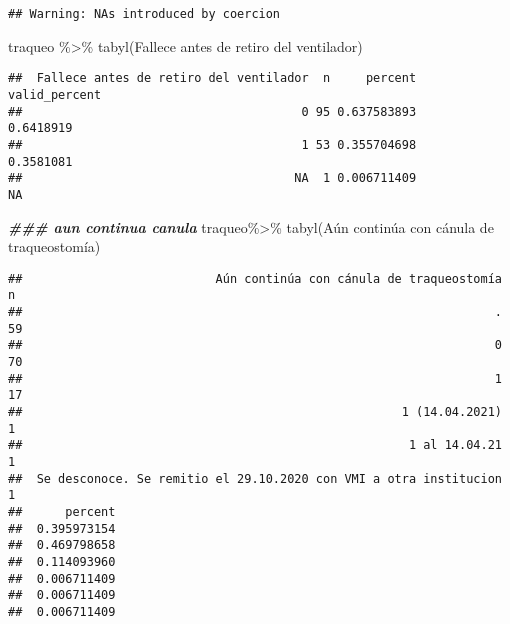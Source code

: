 \documentclass[
]{article}
\newenvironment{Shaded}{\begin{snugshade}}{\end{snugshade}}
\newcommand{\AttributeTok}[1]{\textcolor[rgb]{0.77,0.63,0.00}{#1}}
\newcommand{\DocumentationTok}[1]{\textcolor[rgb]{0.56,0.35,0.01}{\textbf{\textit{#1}}}}
\newcommand{\FunctionTok}[1]{\textcolor[rgb]{0.00,0.00,0.00}{#1}}
\newcommand{\NormalTok}[1]{#1}
\newcommand{\OtherTok}[1]{\textcolor[rgb]{0.56,0.35,0.01}{#1}}
\newcommand{\SpecialCharTok}[1]{\textcolor[rgb]{0.00,0.00,0.00}{#1}}
\newcommand{\StringTok}[1]{\textcolor[rgb]{0.31,0.60,0.02}{#1}}
\begin{document}
\begin{Shaded}
\end{Shaded}

\begin{verbatim}
## Warning: NAs introduced by coercion
\end{verbatim}

\begin{Shaded}
\begin{Highlighting}[]
\NormalTok{traqueo }\SpecialCharTok{\%\textgreater{}\%}
  \FunctionTok{tabyl}\NormalTok{(}\StringTok{\textasciigrave{}}\AttributeTok{Fallece antes de retiro del ventilador}\StringTok{\textasciigrave{}}\NormalTok{)}
\end{Highlighting}
\end{Shaded}

\begin{verbatim}
##  Fallece antes de retiro del ventilador  n     percent valid_percent
##                                       0 95 0.637583893     0.6418919
##                                       1 53 0.355704698     0.3581081
##                                      NA  1 0.006711409            NA
\end{verbatim}

\begin{Shaded}
\begin{Highlighting}[]
\DocumentationTok{\#\#\# aun continua canula}
\NormalTok{traqueo}\SpecialCharTok{\%\textgreater{}\%}
  \FunctionTok{tabyl}\NormalTok{(}\StringTok{\textasciigrave{}}\AttributeTok{Aún continúa con cánula de traqueostomía}\StringTok{\textasciigrave{}}\NormalTok{)}
\end{Highlighting}
\end{Shaded}

\begin{verbatim}
##                           Aún continúa con cánula de traqueostomía  n
##                                                                  . 59
##                                                                  0 70
##                                                                  1 17
##                                                     1 (14.04.2021)  1
##                                                      1 al 14.04.21  1
##  Se desconoce. Se remitio el 29.10.2020 con VMI a otra institucion  1
##      percent
##  0.395973154
##  0.469798658
##  0.114093960
##  0.006711409
##  0.006711409
##  0.006711409
\end{verbatim}
\end{document}
